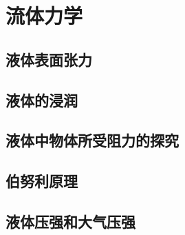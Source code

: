 \section{流体力学}
\subsection{液体表面张力}
\subsection{液体的浸润}
\subsection{液体中物体所受阻力的探究}
\subsection{伯努利原理}
\subsection{液体压强和大气压强}